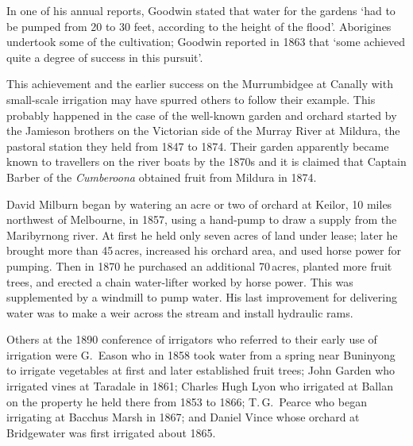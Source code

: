 In one of his annual reports, Goodwin stated that water for the
gardens `had to be pumped from 20 to 30 feet, according to the height
of the flood'.  Aborigines  undertook some of the
cultivation; Goodwin reported in 1863 that `some achieved quite a
degree of success in this pursuit'.

This achievement and the earlier success on the Murrumbidgee
at Canally  with small-scale 
irrigation may have spurred others to follow their example.  This
probably happened in the case of the well-known garden and orchard
started by the Jamieson brothers on the Victorian side of the Murray
River  at Mildura,  the
pastoral station they held from 1847 to 1874.  Their garden apparently
became known to travellers on the river boats  by
the 1870s and it is claimed that Captain Barber of the
\textit{Cumberoona} obtained fruit from Mildura in
1874.

David Milburn  began by watering an acre or two of
orchard at Keilor,  10 miles northwest of
Melbourne, in 1857, using a hand-pump  to draw a
supply from the Maribyrnong river.  At first
he held only seven acres of land under lease; later he brought more
than 45\,acres, increased his orchard area, and used horse power
 for pumping.  Then in
1870 he purchased an additional 70\,acres, planted more fruit trees,
and erected a chain water-lifter worked by horse power.  This was
supplemented by a windmill  to pump water. His last
improvement for delivering water was to make a weir 
across the stream and install hydraulic rams.

Others at the 1890 conference of irrigators who referred to their
early use of irrigation were G.~Eason
 who in 1858 took water from a spring near Buninyong
 to irrigate vegetables at first and later
established fruit trees; John Garden
  who
irrigated vines  at Taradale  in
1861; Charles Hugh Lyon  who irrigated at Ballan
 on the property he held there from 1853 to 1866;
T.\,G.~Pearce  who began irrigating at Bacchus
Marsh  in 1867; and Daniel Vince
 whose orchard at Bridgewater  was first irrigated about 1865.

